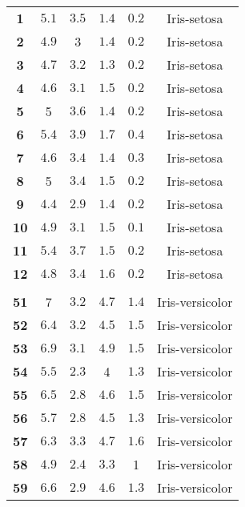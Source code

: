 \begin{longtable}[c]{cccccc}
\textbf{1} & $\num{5,1}$ & $\num{3,5}$ & $\num{1,4}$ & $\num{0,2}$ & Iris-setosa\\
\textbf{2} & $\num{4,9}$ & 3     & $\num{1,4}$ & $\num{0,2}$ & Iris-setosa \\
\textbf{3} & $\num{4,7}$ & $\num{3,2}$ & $\num{1,3}$ & $\num{0,2}$ & Iris-setosa \\
\textbf{4} & $\num{4,6}$ & $\num{3,1}$ & $\num{1,5}$ & $\num{0,2}$ & Iris-setosa \\
\textbf{5} & 5     & $\num{3,6}$ & $\num{1,4}$ & $\num{0,2}$ & Iris-setosa \\
\textbf{6} & $\num{5,4}$ & $\num{3,9}$ & $\num{1,7}$ & $\num{0,4}$ & Iris-setosa \\
\textbf{7} & $\num{4,6}$ & $\num{3,4}$ & $\num{1,4}$ & $\num{0,3}$ & Iris-setosa \\
\textbf{8} & 5     & $\num{3,4}$ & $\num{1,5}$ & $\num{0,2}$ & Iris-setosa \\
\textbf{9} & $\num{4,4}$ & $\num{2,9}$ & $\num{1,4}$ & $\num{0,2}$ & Iris-setosa \\
\textbf{10} & $\num{4,9}$ & $\num{3,1}$ & $\num{1,5}$ & $\num{0,1}$ & Iris-setosa \\
\textbf{11} & $\num{5,4}$ & $\num{3,7}$ & $\num{1,5}$ & $\num{0,2}$ & Iris-setosa \\
\textbf{12} & $\num{4,8}$ & $\num{3,4}$ & $\num{1,6}$ & $\num{0,2}$ & Iris-setosa \\
\\
\textbf{51} & 7     & $\num{3,2}$ & $\num{4,7}$ & $\num{1,4}$ & Iris-versicolor \\
\textbf{52} & $\num{6,4}$ & $\num{3,2}$ & $\num{4,5}$ & $\num{1,5}$ & Iris-versicolor \\
\textbf{53} & $\num{6,9}$ & $\num{3,1}$ & $\num{4,9}$ & $\num{1,5}$ & Iris-versicolor \\
\textbf{54} & $\num{5,5}$ & $\num{2,3}$ & 4     & $\num{1,3}$ & Iris-versicolor \\
\textbf{55} & $\num{6,5}$ & $\num{2,8}$ & $\num{4,6}$ & $\num{1,5}$ & Iris-versicolor \\
\textbf{56} & $\num{5,7}$ & $\num{2,8}$ & $\num{4,5}$ & $\num{1,3}$ & Iris-versicolor \\
\textbf{57} & $\num{6,3}$ & $\num{3,3}$ & $\num{4,7}$ & $\num{1,6}$ & Iris-versicolor \\
\textbf{58} & $\num{4,9}$ & $\num{2,4}$ & $\num{3,3}$ & 1     & Iris-versicolor \\
\textbf{59} & $\num{6,6}$ & $\num{2,9}$ & $\num{4,6}$ & $\num{1,3}$ & Iris-versicolor \\

\end{longtable}
